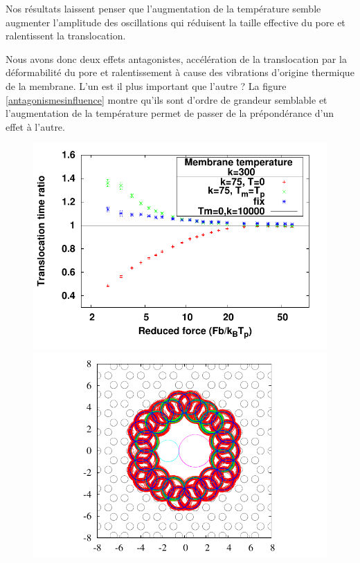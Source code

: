  Nos résultats laissent penser que l'augmentation de la température semble augmenter l'amplitude des oscillations qui réduisent la taille effective du pore et ralentissent la translocation.
 \newpage
 
 Nous avons donc deux effets antagonistes, accélération de la translocation par la déformabilité du pore et ralentissement à cause des vibrations d'origine thermique de la membrane. L'un est il plus important que l'autre ? La figure \ref{antagonismesinfluence} montre qu'ils sont d'ordre de grandeur semblable et l'augmentation de la température permet de passer de la prépondérance d'un effet à l'autre.

\begin{figure}[H]
\includegraphics[width=\textwidth]{compbothbehaviour.pdf} 
\begin{minipage}{0.63\linewidth}
\includegraphics[width=\textwidth]{poreareaall.pdf}

\end{minipage}
\end{figure}
